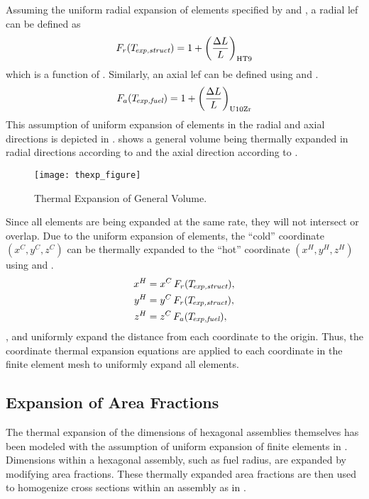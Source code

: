     Assuming the uniform radial expansion of elements specified by
     and \texpstruct, a radial \gls{lef} can be defined as
    \begin{equation}
      \label{eq:lef_r}
      F_r(T_{\!\mbox{\scriptsize \em exp,struct}}) = 1 + \left(\frac{\Delta L}{L}\right)_{\text{HT9}}
    \end{equation}
    which is a function of \texpstruct. Similarly, an axial \gls{lef} can be
    defined using  and \texpfuel.
    \begin{equation}
      \label{eq:lef_a}
      F_a({T_{\!\mbox{\scriptsize \em exp,fuel}}}) = 1 + \left(\frac{\Delta L}{L}\right)_{\text{U10Zr}}
    \end{equation}
    This assumption of uniform expansion of elements in the radial and axial
    directions is depicted in . 
    shows a general volume being thermally expanded in radial directions
    according to  and the axial direction according to
    .

    \begin{figure}
      \centering
      \texttt{[image: thexp\_figure]}
      \caption{Thermal Expansion of General Volume.}
      \label{fig:thexp_figure}
    \end{figure}

    Since all elements are being expanded at the same rate, they will not
    intersect or overlap. Due to the uniform expansion of elements, the ``cold''
    coordinate $(x^C,y^C,z^C)$ can be thermally expanded to the ``hot''
    coordinate $(x^H,y^H,z^H)$ using  and .
    \begin{align}
      \label{eq:expand_x}
      x^H &= x^C \, F_r(T_{\!\mbox{\scriptsize \em exp,struct}}), \\
      \label{eq:expand_y}
      y^H &= y^C \, F_r(T_{\!\mbox{\scriptsize \em exp,struct}}), \\
      \label{eq:expand_z}
      z^H &= z^C \, F_a({T_{\!\mbox{\scriptsize \em exp,fuel}}}),
    \end{align}
    ,  and  uniformly
    expand the distance from each coordinate to the origin. Thus, the coordinate
    thermal expansion equations are applied to each coordinate in the finite
    element mesh to uniformly expand all elements.

  \subsection{Expansion of Area Fractions}
    \label{sec:expansion_of_area_fractions}
    The thermal expansion of the dimensions of hexagonal assemblies themselves 
    has been modeled with the assumption of uniform expansion of finite elements
    in . Dimensions within a hexagonal
    assembly, such as fuel radius, are expanded by modifying area fractions.
    These thermally expanded area fractions are then used to homogenize cross
    sections within an assembly as in .

